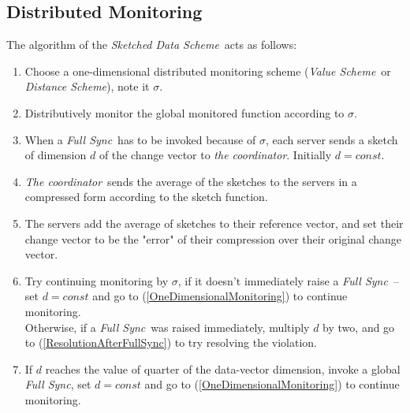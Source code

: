 \documentclass[10pt, conference]{IEEEtran}
\newcommand{\valueScheme}{\textit{Value Scheme}}
\newcommand{\distanceScheme}{\textit{Distance Scheme}}
\newcommand{\sketchScheme}{\textit{Sketched Data Scheme}}
\newcommand{\fullSync}{\textit{Full Sync}}
\newcommand{\theCoordinator}{\textit{the coordinator}}
\newcommand{\TheCoordinator}{\textit{The coordinator}}
\begin{document}
\subsection{Distributed Monitoring}
The algorithm of the \sketchScheme \ acts as follows:
\begin{enumerate}
\item Choose a one-dimensional distributed monitoring scheme (\valueScheme \ or \distanceScheme ), note it $\sigma$.
\item \label{OneDimensionalMonitoring} Distributively monitor the global monitored function according to $\sigma$.
\item \label{ResolutionAfterFullSync} When a \fullSync \ has to be invoked because of $\sigma$, each server sends a sketch of dimension $d$ of the change vector to \theCoordinator . Initially $d = const$.
\item \TheCoordinator \ sends the average of the sketches to the servers in a compressed form according to the sketch function.
\item The servers add the average of sketches to their reference vector, and set their change vector to be the "error" of their compression over their original change vector.
\item Try continuing monitoring by $\sigma$, if it doesn't immediately raise a \fullSync \ -- set ${d = const}$ and go to (\ref{OneDimensionalMonitoring}) to continue monitoring. \\
Otherwise, if a \fullSync \ was raised immediately, multiply $d$ by two, and go to (\ref{ResolutionAfterFullSync}) to try resolving the violation.
\item If $d$ reaches the value of quarter of the data-vector dimension, invoke a global \fullSync , set $d = const$ and go to (\ref{OneDimensionalMonitoring}) to continue monitoring.
\end{enumerate}
\end{document}
